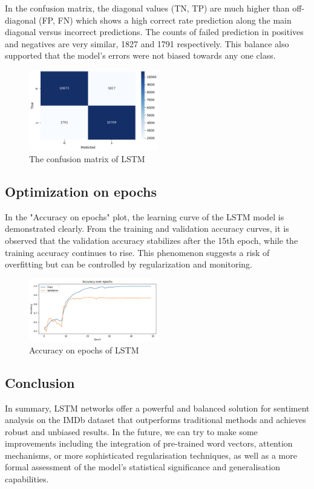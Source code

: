 In the confusion matrix, the diagonal values (TN, TP) are much higher than off-diagonal (FP, FN) which shows a high correct rate prediction along the main diagonal versus incorrect predictions. The counts of failed prediction in positives and negatives are very similar, 1827 and 1791 respectively. This balance also supported that the model's errors were not biased towards any one class.

\begin{figure}[ht]
    \centering
    \includegraphics[width=0.5\textwidth]{pics/lstm_metrix.png}
    \caption{The confusion matrix of LSTM}
\end{figure}

\subsection{Optimization on epochs}
In the "Accuracy on epochs" plot, the learning curve of the LSTM model is demonstrated clearly. From the training and validation accuracy curves, it is observed that the validation accuracy stabilizes after the 15th epoch, while the training accuracy continues to rise. This phenomenon suggests a risk of overfitting but can be controlled by regularization and monitoring.

\begin{figure}[ht]
    \centering
    \includegraphics[width=0.5\textwidth]{pics/lstm_accuracy_s.png}
    \caption{Accuracy on epochs of LSTM}
\end{figure}

\subsection{Conclusion}
In summary, LSTM networks offer a powerful and balanced solution for sentiment analysis on the IMDb dataset that outperforms traditional methods and achieves robust and unbiased results. In the future, we can try to make some improvements including the integration of pre-trained word vectors, attention mechanisms, or more sophisticated regularisation techniques, as well as a more formal assessment of the model's statistical significance and generalisation capabilities.





